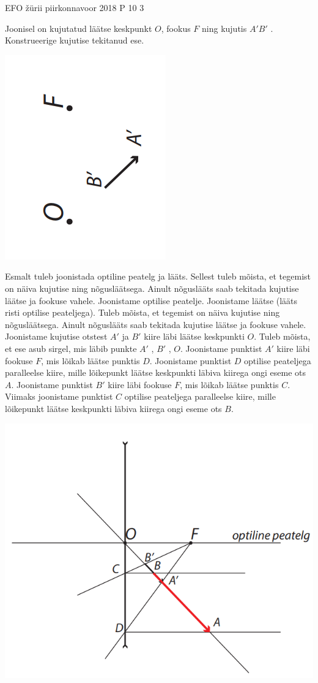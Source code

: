 {EFO žürii} %
{piirkonnavoor} %
{2018} %
{P 10} %
{3} %
{
\ifStatement
Joonisel on kujutatud läätse keskpunkt $O$, fookus $F$ ning kujutis $A'B'$ . Konstrueerige kujutise tekitanud ese.
\begin{center}
	\includegraphics[width=0.5\linewidth]{2018-v2p-10-yl.PNG}
\end{center}
\fi
\ifHint
Esmalt tuleb joonistada optiline peatelg ja lääts. Sellest tuleb mõista, et tegemist on näiva kujutise ning nõgusläätsega. Ainult nõguslääts saab tekitada kujutise läätse ja fookuse vahele.
\fi
\ifSolution
Joonistame optilise peatelje. Joonistame läätse (lääts risti optilise peateljega). Tuleb mõista, et tegemist on näiva kujutise ning nõgusläätsega. Ainult nõguslääts saab tekitada kujutise läätse ja fookuse vahele. Joonistame kujutise otstest $A'$ ja $B'$ kiire läbi läätse keskpunkti $O$. Tuleb mõista, et ese asub sirgel, mis läbib punkte $A'$ , $B'$ , $O$. Joonistame punktist $A'$ kiire läbi fookuse $F$, mis lõikab läätse punktis $D$. Joonistame punktist $D$ optilise peateljega paralleelse kiire, mille lõikepunkt läätse keskpunkti läbiva kiirega ongi eseme ots $A$. Joonistame punktist $B'$ kiire läbi fookuse $F$, mis lõikab läätse punktis $C$. Viimaks joonistame punktist $C$ optilise peateljega paralleelse kiire, mille lõikepunkt läätse keskpunkti läbiva kiirega ongi eseme ots $B$.
\begin{center}
	\includegraphics[width=0.5\linewidth]{2018-v2p-10-lah.PNG}
\end{center}
\fi
}
